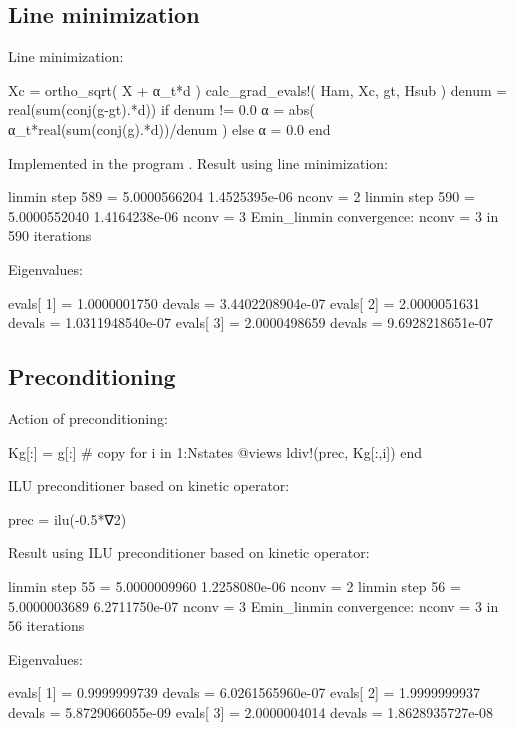 \subsection{Line minimization}

Line minimization:
\begin{juliacode}
Xc = ortho_sqrt( X + α_t*d )
calc_grad_evals!( Ham, Xc, gt, Hsub )
denum = real(sum(conj(g-gt).*d))
if denum != 0.0
    α = abs( α_t*real(sum(conj(g).*d))/denum )
else
    α = 0.0
end
\end{juliacode}

Implemented in the program .
Result using line minimization:
\begin{textcode}
linmin step      589 =       5.0000566204   1.4525395e-06  nconv =     2
linmin step      590 =       5.0000552040   1.4164238e-06  nconv =     3
Emin_linmin convergence: nconv =     3 in   590 iterations
  
Eigenvalues:
  
evals[  1] =       1.0000001750 devals =   3.4402208904e-07
evals[  2] =       2.0000051631 devals =   1.0311948540e-07
evals[  3] =       2.0000498659 devals =   9.6928218651e-07  
\end{textcode}


\subsection{Preconditioning}

Action of preconditioning:

\begin{juliacode}
Kg[:] = g[:] # copy
for i in 1:Nstates
    @views ldiv!(prec, Kg[:,i])
end
\end{juliacode}

ILU preconditioner based on kinetic operator:
\begin{juliacode}
prec = ilu(-0.5*∇2)
\end{juliacode}

Result using ILU preconditioner based on kinetic operator:
\begin{textcode}
linmin step       55 =       5.0000009960   1.2258080e-06  nconv =     2
linmin step       56 =       5.0000003689   6.2711750e-07  nconv =     3
Emin_linmin convergence: nconv =     3 in    56 iterations

Eigenvalues:

evals[  1] =       0.9999999739 devals =   6.0261565960e-07
evals[  2] =       1.9999999937 devals =   5.8729066055e-09
evals[  3] =       2.0000004014 devals =   1.8628935727e-08  
\end{textcode}

